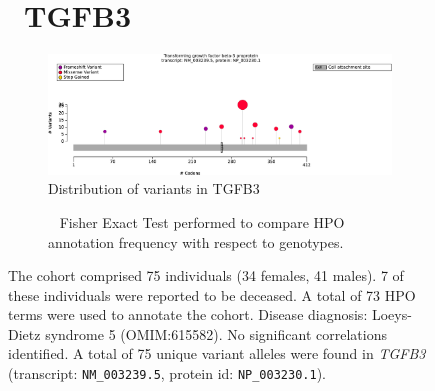 \begin{figure}[htbp]
\section*{ TGFB3}
\centering
\begin{subfigure}[b]{0.95\textwidth}
\centering
\includegraphics[width=\textwidth]{ img/TGFB3_protein_diagram.pdf} 
\captionsetup{justification=raggedright,singlelinecheck=false}
\caption{Distribution of variants in TGFB3}
\end{subfigure}

\vspace{2em}

\begin{subfigure}[b]{0.95\textwidth}
\centering
{}
\captionsetup{justification=raggedright,singlelinecheck=false}
\caption{             Fisher Exact Test performed to compare HPO annotation frequency with respect to genotypes. }
\end{subfigure}

\vspace{2em}

\caption{ The cohort comprised 75 individuals (34 females, 41 males). 7 of these individuals were reported to be deceased. A total of 73 HPO terms were used to annotate the cohort. Disease diagnosis: Loeys-Dietz syndrome 5 (OMIM:615582). No significant correlations identified. A total of 75 unique variant alleles were found in \textit{TGFB3} (transcript: \texttt{NM\_003239.5}, protein id: \texttt{NP\_003230.1}).}
\end{figure}
